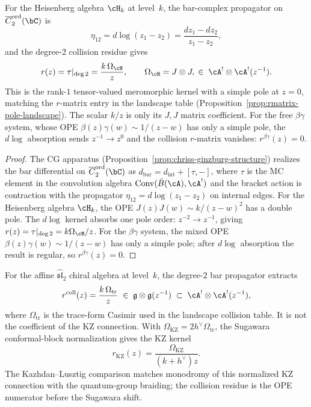 \begin{proposition}
\label{prop:free-propagator-matching}
For the Heisenberg algebra $\cH_k$ at level~$k$, the
bar-complex propagator on $\overline{C}_2^{\mathrm{ord}}(\bC)$
is
\[
\eta_{12} = d\log(z_1 - z_2)
= \frac{dz_1 - dz_2}{z_1 - z_2},
\]
and the degree-$2$ collision residue gives
\[
r(z) = \tau|_{\deg 2}
= \frac{k\,\Omega_{\cH}}{z},
\qquad
\Omega_{\cH}=J\otimes J,
\;\in\;
\cA^! \otimes \cA^!(z^{-1}).
\]
This is the rank-$1$ tensor-valued meromorphic kernel with a simple pole at
$z = 0$, matching the $r$-matrix entry in the landscape table
\textup{(}Proposition~\textup{\ref{prop:rmatrix-pole-landscape})}.
The scalar $k/z$ is only its $J,J$ matrix coefficient.
For the free $\beta\gamma$ system, whose OPE
$\beta(z)\gamma(w) \sim 1/(z{-}w)$ has only a simple pole,
the $d\log$ absorption sends $z^{-1} \to z^0$ and
the collision $r$-matrix vanishes: $r^{\beta\gamma}(z) = 0$.
\end{proposition}

\begin{proof}
The CG apparatus (Proposition~\ref{prop:chriss-ginzburg-structure})
realizes the bar differential on
$\overline{C}_2^{\mathrm{ord}}(\bC)$ as $d_{\mathrm{bar}} =
d_{\mathrm{int}} + [\tau, -]$, where $\tau$ is the MC element in
the convolution algebra $\operatorname{Conv}(\bar B(\cA), \cA^!)$ and the bracket
action is contraction with the propagator
$\eta_{12} = d\log(z_1 - z_2)$
on internal edges. For the Heisenberg algebra $\cH_k$, the OPE
$J(z)J(w) \sim k/(z{-}w)^2$ has a double pole. The $d\log$ kernel
absorbs one pole order: $z^{-2} \to z^{-1}$, giving
$r(z) = \tau|_{\deg 2} = k\Omega_{\cH}/z$.
For the $\beta\gamma$ system, the mixed OPE
$\beta(z)\gamma(w) \sim 1/(z{-}w)$ has only a simple pole;
after $d\log$ absorption the result is regular, so
$r^{\beta\gamma}(z) = 0$.
\end{proof}

\begin{proposition}
\label{prop:affine-propagator-matching}
For the affine $\hat{\mathfrak{sl}}_2$ chiral algebra at level~$k$,
the degree-$2$ bar propagator extracts
\[
r^{\mathrm{coll}}(z) = \frac{k\,\Omega_{\mathrm{tr}}}{z}
\;\in\;
\mathfrak{g} \otimes \mathfrak{g}(z^{-1})
\;\subset\;
\cA^! \otimes \cA^!(z^{-1}),
\]
where $\Omega_{\mathrm{tr}}$ is the trace-form Casimir used in the
landscape collision table. It is not the coefficient of the KZ
connection. With
$\Omega_{\mathrm{KZ}}=2h^\vee\Omega_{\mathrm{tr}}$, the Sugawara
conformal-block normalization gives the KZ kernel
\[
 r_{\mathrm{KZ}}(z)
 = \frac{\Omega_{\mathrm{KZ}}}{(k+h^\vee)z}.
\]
The Kazhdan--Lusztig comparison matches monodromy of this normalized
KZ connection with the quantum-group braiding; the collision residue
is the OPE numerator before the Sugawara shift.
\end{proposition}

